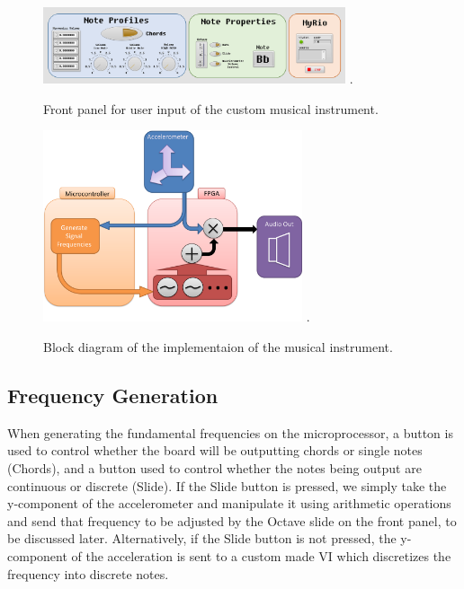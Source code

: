 \begin{figure}[!t]
\centering
\includegraphics[width=3.5in]{instrumentfrontpanel.png}
\DeclareGraphicsExtensions.
\caption{Front panel for user input of the custom musical instrument.}
\label{fig_p1front}
\end{figure} 

\begin{figure}[!t]
\centering
\includegraphics[width=3in]{part1blockdiagram.png}
\DeclareGraphicsExtensions.
\caption{Block diagram of the implementaion of the musical instrument.}
\label{fig_p1block}
\end{figure} 

\subsection{Frequency Generation}

When generating the fundamental frequencies on the microprocessor, a button is used to control whether the board will be outputting chords or single notes (Chords), and a button used to control whether the notes being output are continuous or discrete (Slide).
 If the Slide button is pressed, we simply take the y-component of the accelerometer and manipulate it using arithmetic operations and send that frequency to be adjusted by the Octave slide on the front panel, to be discussed later.
 Alternatively, if the Slide button is not pressed, the y-component of the acceleration is sent to a custom made VI which discretizes the frequency into discrete notes.


